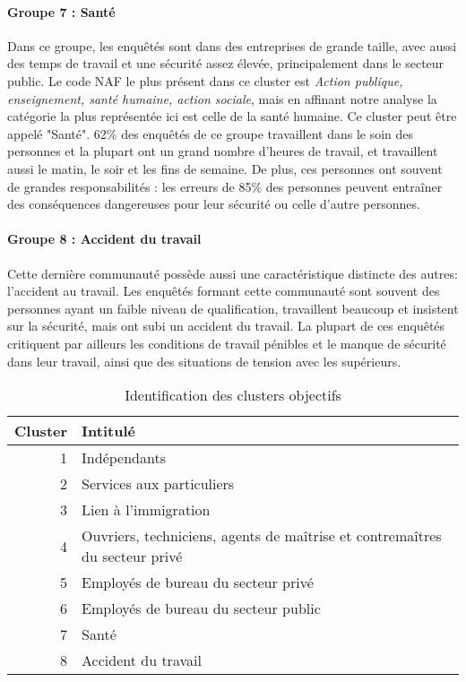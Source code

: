 \documentclass[11pt,fleqn,a4paper,openany,frenchb]{book} %
\begin{document}
\paragraph{Groupe 7 : Santé\\}
Dans ce groupe, les enquêtés sont dans des entreprises de grande taille, avec aussi des temps de travail et une sécurité assez élevée, principalement dans le secteur public. Le code NAF le plus présent dans ce cluster est \textit{Action publique, enseignement, santé humaine, action sociale}, mais en affinant notre analyse la catégorie la plus représentée ici est celle de la santé humaine. Ce cluster peut être appelé "Santé". 62\% des enquêtés de ce groupe travaillent dans le soin des personnes et la plupart ont un grand nombre d'heures de travail, et travaillent aussi le matin, le soir et les fins de semaine. De plus, ces personnes ont souvent de grandes responsabilités : les erreurs de 85\% des personnes peuvent entraîner des conséquences dangereuses pour leur sécurité ou celle d'autre personnes.

\paragraph{Groupe 8 : Accident du travail\\}
Cette dernière communauté possède aussi une caractéristique distincte des autres: l'accident au travail. Les enquêtés formant cette communauté sont souvent des personnes ayant un faible niveau de qualification, travaillent beaucoup et insistent sur la sécurité, mais ont subi un accident du travail. La plupart de ces enquêtés critiquent par ailleurs les conditions de travail pénibles et le manque de sécurité dans leur travail, ainsi que des situations de tension avec les supérieurs.\\


\begin{table}[!h]
\centering
\begin{tabular}{|r||p{6cm}|}
\hline
 Cluster & Intitulé \\
 \hline
 1 & Indépendants \\ 
 \hline
 2 & Services aux particuliers\\
 \hline
 3 & Lien à l'immigration\\
 \hline
 4 & Ouvriers, techniciens, agents de maîtrise et contremaîtres du secteur privé\\
 \hline
 5 & Employés de bureau du secteur privé\\
 \hline
 6 & Employés de bureau du secteur public\\
 \hline
 7 & Santé \\
 \hline
 8 & Accident du travail\\
 \hline
\end{tabular}%
\caption{Identification des clusters objectifs}
\label{tab:nom_clusters_obj}
\end{table}
\end{document}
